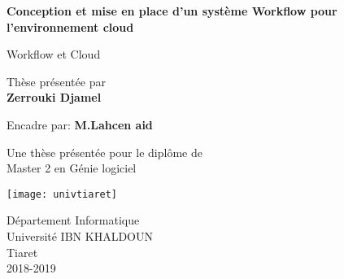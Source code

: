 \begin{titlepage}
    \begin{center}
        \vspace*{1cm}
 
        \Huge
        \textbf{Conception et mise en place d’un système Workflow  pour l'environnement cloud}
 
        \vspace{0.5cm}
        \LARGE
        Workflow et Cloud
 
        \vspace{1.5cm}
 Thèse présentée par\\
        \textbf{Zerrouki Djamel}
 
        \vspace{0.5cm}
 
      Encadre par:  \textbf{M.Lahcen aid}
       
        \vfill
 
        Une thèse présentée pour le diplôme de \\
         Master 2  en Génie  logiciel
 
        \vspace{0.8cm}
 
        \texttt{[image: univtiaret]}
 
        \Large
        Département Informatique\\
        Université IBN KHALDOUN\\
        Tiaret\\
        2018-2019
 
    \end{center}
\end{titlepage}